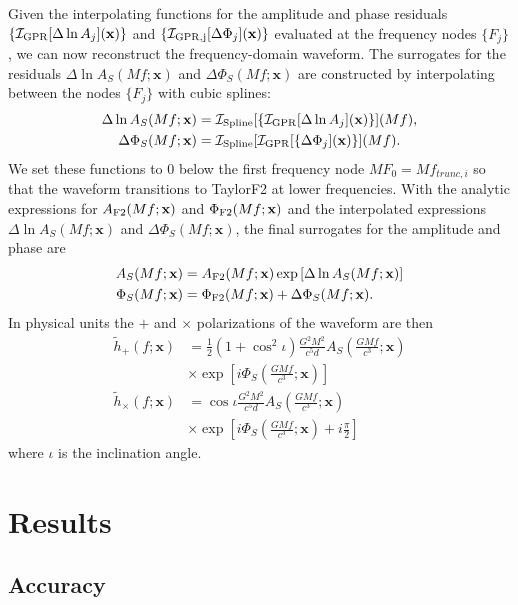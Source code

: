 \documentclass[prd,aps,letter,twocolumn,floatfix,notitlepage,nofootinbib]{revtex4-1}
\def\bx{\mathbf{x}}
\begin{document}
Given the interpolating functions for the amplitude and phase residuals $\{\mathcal{I}_{\rm GPR}[\Delta\ln A_j](\bx)\}$ and $\{\mathcal{I}_{\rm GPR, j}[\Delta\Phi_j](\bx)\}$ evaluated at the frequency nodes $\{F_j\}$, we can now reconstruct the frequency-domain waveform. The surrogates for the residuals $\Delta\ln A_S(Mf;\bx)$ and $\Delta\Phi_S(Mf;\bx)$ are constructed by interpolating between the nodes $\{F_j\}$ with cubic splines:
\begin{align}
\Delta\ln A_S(Mf;\bx) &= \mathcal{I}_{\rm Spline}[\{\mathcal{I}_{\rm GPR}[\Delta\ln A_j](\bx)\}](Mf),\\
\Delta\Phi_S(Mf;\bx) &= \mathcal{I}_{\rm Spline}[\mathcal{I}_{\rm GPR}[\{\Delta\Phi_j](\bx)\}](Mf).
\end{align}
We set these functions to 0 below the first frequency node $MF_0 =  Mf_{trunc,i}$ so that the waveform transitions to TaylorF2 at lower frequencies. With the analytic expressions for $A_{\rm F2}(Mf;\bx)$ and $\Phi_{\rm F2}(Mf;\bx)$ and the interpolated expressions $\Delta\ln A_S(Mf;\bx)$ and $\Delta\Phi_S(Mf;\bx)$, the final surrogates for the amplitude and phase are
\begin{align}
A_S(Mf;\bx) &= A_{\rm F2}(Mf;\bx) \exp\left[ \Delta\ln A_S(Mf;\bx) \right] \\
\Phi_S(Mf;\bx) &= \Phi_{\rm F2}(Mf;\bx) + \Delta\Phi_S(Mf;\bx).
\end{align}
In physical units the $+$ and $\times$ polarizations of the waveform are then 
\begin{align}
\tilde h_+(f; \bx) &= \frac{1}{2}(1+\cos^2\iota) \frac{G^2 M^2}{c^5 d} A_S\left(\frac{GMf}{c^3}; \bx\right) \nonumber \\
& \times \exp\left[i \Phi_S\left(\frac{GMf}{c^3}; \bx\right)\right] \\
\tilde h_\times(f; \bx) &= \cos\iota \frac{G^2 M^2}{c^5 d} A_S\left(\frac{GMf}{c^3}; \bx\right) \nonumber \\
& \times \exp\left[i \Phi_S\left(\frac{GMf}{c^3}; \bx\right) + i \frac{\pi}{2}\right]
\end{align}
where $\iota$ is the inclination angle.



\section{Results}

\subsection{Accuracy}
\end{document}

